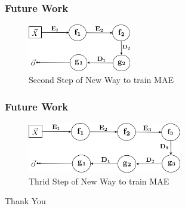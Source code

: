 \documentclass{beamer}
\begin{document}
\begin{frame}
\frametitle{Future Work}
\begin{figure}[t!]
    \centering
    \includegraphics[width=0.4\textwidth]{../paper/pictures/figures/train_new_MAE2.png}
    \caption{Second Step of New Way to train MAE}
    \label{fig:train_NMAE2}
\end{figure}
\end{frame}

\begin{frame}
\frametitle{Future Work}
\begin{figure}[t!]
    \centering
    \includegraphics[width=0.6\textwidth]{../paper/pictures/figures/train_new_MAE3.png}
    \caption{Thrid Step of New Way to train MAE}
    \label{fig:train_NMAE3}
\end{figure}
\end{frame}

\begin{frame}
\begin{center} 
\Huge Thank You 
\end{center} 
\end{frame}


%
%
\end{document}
